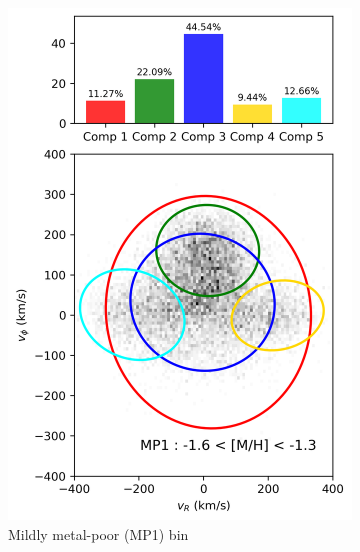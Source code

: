 \documentclass[a4paper,10pt]{article}
\begin{document}
\begin{multicols}{2}
\begin{figure}[H]
\begin{subfigure}[t]{0.48\linewidth}
    \includegraphics[width=\linewidth]{../figures/gmm_MP1.png}
    \caption{Mildly metal-poor (MP1) bin}
    \label{fig:gmm_mp1}
  \end{subfigure}
  \hfill
  \begin{subfigure}[t]{0.48\linewidth}

\end{subfigure}
\end{figure}
\end{multicols}
\end{document}
